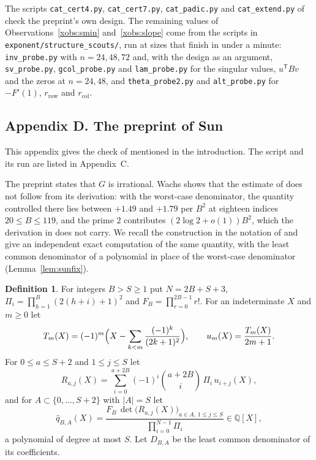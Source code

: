 \documentclass[11pt]{article}
\theoremstyle{definition}
\newtheorem{definition}[theorem]{Definition}
\begin{document}
The scripts \texttt{cat\_cert4.py}, \texttt{cat\_cert7.py}, \texttt{cat\_padic.py} and \texttt{cat\_extend.py} of \cite{MCSC} check the preprint's own design. The remaining values of Observations~\ref{xobs:smin} and~\ref{xobs:slope} come from the scripts in \texttt{exponent/structure\_scouts/}, run at sizes that finish in under a minute: \texttt{inv\_probe.py} with $n=24,48,72$ and, with the design as an argument, \texttt{sv\_probe.py}, \texttt{gcol\_probe.py} and \texttt{lam\_probe.py} for the singular values, $u^{\mathsf T}Bv$ and the zeros at $n=24,48$, and \texttt{theta\_probe2.py} and \texttt{alt\_probe.py} for $-F'(1)$, $r_{\mathrm{row}}$ and $r_{\mathrm{col}}$.

\clearpage
\subsection*{Appendix D. The preprint of Sun}

This appendix gives the check of \cite{Sun} mentioned in the introduction. The script and its run are listed in Appendix~C.

The preprint \cite{Sun} states that $G$ is irrational. Wachs \cite{Wachs} shows that the estimate of \cite[Theorem~9.1]{Sun} does not follow from its derivation: with the worst-case denominator, the quantity controlled there lies between $+1.49$ and $+1.79$ per $B^2$ at eighteen indices $20\le B\le119$, and the prime $2$ contributes $(2\log2+o(1))B^2$, which the derivation in \cite[Secs.~6--9]{Sun} does not carry. We recall the construction in the notation of \cite{Sun} and give an independent exact computation of the same quantity, with the least common denominator of a polynomial in place of the worst-case denominator (Lemma~\ref{lem:sunfix}).

\begin{definition}\label{def:sun}
For integers $B>S\ge1$ put $N=2B+S+3$, $\Pi_i=\prod_{h=1}^{B}(2(h+i)+1)^2$ and $F_B=\prod_{r=0}^{2B-1}r!$. For an indeterminate $X$ and $m\ge0$ let
\[
T_m(X)=(-1)^m\Bigl(X-\sum_{k<m}\frac{(-1)^k}{(2k+1)^2}\Bigr),\qquad u_m(X)=\frac{T_m(X)}{2m+1}.
\]
For $0\le a\le S+2$ and $1\le j\le S$ let
\[
R_{a,j}(X)=\sum_{i=0}^{a+2B}(-1)^i\binom{a+2B}{i}\,\Pi_i\,u_{i+j}(X),
\]
and for $A\subset\{0,\dots,S+2\}$ with $|A|=S$ let
\[
\hat q_{B,A}(X)=\frac{F_B\,\det\bigl(R_{a,j}(X)\bigr)_{a\in A,\,1\le j\le S}}{\prod_{i=0}^{N-1}\Pi_i}\in\mathbb Q[X],
\]
a polynomial of degree at most $S$. Let $D_{B,A}$ be the least common denominator of its coefficients.
\end{definition}
\end{document}
